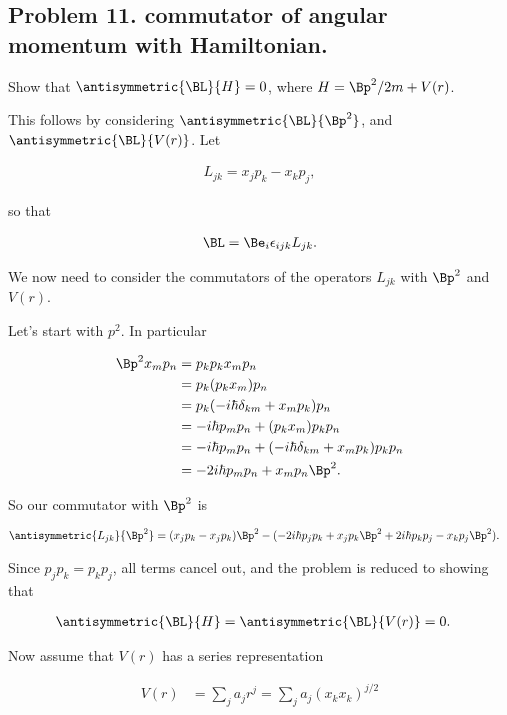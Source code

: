 \subsection{Problem 11. commutator of angular momentum with Hamiltonian.}

Show that $\antisymmetric{\BL}{H} = 0$, where $H = \Bp^2/2m + V(r)$.

This follows by considering $\antisymmetric{\BL}{\Bp^2}$, and $\antisymmetric{\BL}{V(r)}$.  Let

\begin{align}\label{eqn:desaiCh3:1100}
L_{jk} = x_j p_k - x_k p_j,
\end{align}

so that 

\begin{align}\label{eqn:desaiCh3:1101}
\BL = \Be_i \epsilon_{ijk} L_{jk}.
\end{align}

We now need to consider the commutators of the operators $L_{jk}$ with $\Bp^2$ and $V(r)$.

Let's start with $p^2$.  In particular

\begin{align*}
\Bp^2 x_m p_n
&=
p_k p_k x_m p_n \\
&=
p_k (p_k x_m) p_n \\
&=
p_k (-i\hbar \delta_{km} + x_m p_k) p_n \\
&=
-i\hbar p_m p_n + (p_k x_m) p_k p_n \\
&=
-i\hbar p_m p_n + (-i \hbar \delta_{km} + x_m p_k ) p_k p_n \\
&=
-2 i\hbar p_m p_n + x_m p_n \Bp^2.
\end{align*}

So our commutator with $\Bp^2$ is

\begin{align*}
\antisymmetric{L_{jk}}{\Bp^2}
&=
(x_j p_k - x_j p_k) \Bp^2 
-( -2 i\hbar p_j p_k + x_j p_k \Bp^2 +2 i\hbar p_k p_j - x_k p_j \Bp^2 ).
\end{align*}

Since $p_j p_k = p_k p_j$, all terms cancel out, and the problem is reduced to showing that 

\begin{align*}
\antisymmetric{\BL}{H} &= \antisymmetric{\BL}{V(r)} = 0.
\end{align*}

Now assume that $V(r)$ has a series representation

\begin{align*}
V(r) &= \sum_j a_j r^j = \sum_j a_j (x_k x_k)^{j/2}
\end{align*}

